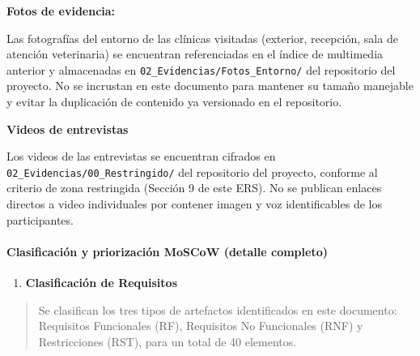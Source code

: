 \documentclass[
]{article}
\begin{document}
\textbf{Fotos de evidencia:}

Las fotografías del entorno de las clínicas visitadas (exterior, recepción,
sala de atención veterinaria) se encuentran referenciadas en el índice de
multimedia anterior y almacenadas en
\texttt{02\_Evidencias/Fotos\_Entorno/} del repositorio del proyecto. No se
incrustan en este documento para mantener su tamaño manejable y evitar la
duplicación de contenido ya versionado en el repositorio.

\textbf{Videos de entrevistas}

Los videos de las entrevistas se encuentran cifrados en
\texttt{02\_Evidencias/00\_Restringido/} del repositorio del proyecto,
conforme al criterio de zona restringida (Sección 9 de este ERS). No se
publican enlaces directos a video individuales por contener imagen y
voz identificables de los participantes.

\paragraph{Clasificación y priorización MoSCoW (detalle
completo)}\label{clasificaciuxf3n-y-priorizaciuxf3n-moscow-detalle-completo}

\begin{enumerate}
\def\labelenumi{\arabic{enumi}.}
\item
  \protect{}\label{_bookmark101}{}\textbf{Clasificación de
  Requisitos}
\end{enumerate}

\begin{quote}
Se clasifican los tres tipos de artefactos identificados en este
documento: Requisitos Funcionales (RF), Requisitos No Funcionales (RNF)
y Restricciones (RST), para un total de 40 elementos.
\end{quote}
\end{document}
